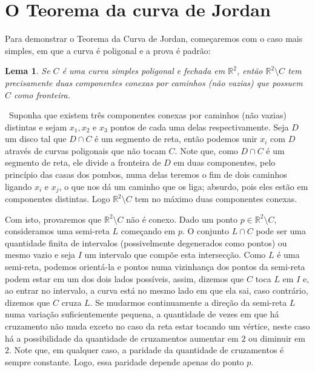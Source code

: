 \documentclass[12pt,a4paper]{article}
\newtheorem{lem}[mydef]{Lema}
\def\dem{\par\smallbreak\noindent {\textit{ Demonstração:}} \ }
\theoremstyle{definition}
\begin{document}
\section{O Teorema da curva de Jordan}

Para demonstrar o Teorema da Curva de Jordan, começaremos com o caso mais simples, em que a curva é poligonal e a prova é padrão: 

\begin{lem}

    Se $C$ é uma curva simples poligonal e fechada em $\mathbb{R}^2$, então $\mathbb{R}^2\setminus C$ tem precisamente duas componentes conexas por caminhos (não vazias) que possuem $C$ como fronteira.

\end{lem}

\dem Suponha que existem três componentes conexas por caminhos (não vazias) distintas e sejam $x_1,x_2$ e $x_3$ pontos de cada uma delas respectivamente. Seja $D$ um disco tal que $D\cap C$ é um segmento de reta, então podemos unir $x_i$ com $D$ através de curvas poligonais que não tocam $C$. Note que, como $D\cap C$ é um segmento de reta, ele divide a fronteira de $D$ em duas componentes, pelo princípio das casas dos pombos, numa delas teremos o fim de dois caminhos ligando $x_i$ e $x_j$, o que nos dá um caminho que os liga; absurdo, pois eles estão em componentes distintas. Logo  $\mathbb{R}^2\setminus C$ tem no máximo duas componentes conexas. 

Com isto, provaremos que $\mathbb{R}^2\setminus C$ não é conexo. Dado um ponto $p\in \mathbb{R}^2\setminus C$, consideramos uma semi-reta $L$ começando em $p$. O conjunto $L\cap C$ pode ser uma quantidade finita de intervalos (possivelmente degenerados como pontos) ou mesmo vazio e seja $I$ um intervalo que compõe esta intersecção. Como $L$ é uma semi-reta, podemos orientá-la e pontos numa vizinhança dos pontos da semi-reta podem estar em um dos dois lados possíveis, assim, dizemos que $C$ toca $L$ em $I$ e, ao entrar no intervalo, a curva está no mesmo lado em que ela sai, caso contrário, dizemos que $C$ cruza $L$. Se mudarmos continuamente a direção da semi-reta $L$ numa variação suficientemente pequena, a quantidade de vezes em que há cruzamento não muda exceto no caso da reta estar tocando um vértice, neste caso há a possibilidade da quantidade de cruzamentos aumentar em $2$ ou diminuir em $2$. Note que, em qualquer caso, a paridade da quantidade de cruzamentos é sempre constante. Logo, essa paridade depende apenas do ponto $p$. 
\end{document}
